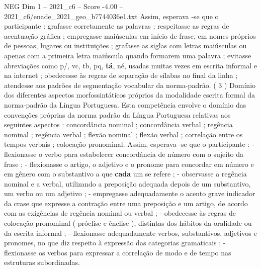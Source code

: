 \begin{textsample}{NEG Dim 1 – 2021\_c6 – Score -4.00 – 2021\_c6/enade\_2021\_geo\_b7744036e1.txt}
Assim, esperava -se que o participante : grafasse corretamente as palavras ; respeitasse as regras de acentuação gráfica ; empregasse maiúsculas em início de frase, em nomes próprios de pessoas, lugares ou instituições ; grafasse as siglas com letras maiúsculas ou apenas com a primeira letra maiúscula quando formarem uma palavra ; evitasse abreviações como p/, vc, tb, pq, \textbf{tá}, né, usadas muitas vezes em escrita informal e na internet ; obedecesse às regras de separação de sílabas no final da linha ; atendesse aos padrões de segmentação vocabular da norma-padrão. ( 3 ) Domínio dos diferentes aspectos morfossintáticos próprios da modalidade escrita formal da norma-padrão da Língua Portuguesa.
Esta competência envolve o domínio das convenções próprias da norma padrão da Língua Portuguesa relativas aos seguintes aspectos : concordância nominal ; concordância verbal ; regência nominal ; regência verbal ; flexão nominal ; flexão verbal ; correlação entre os tempos verbais ; colocação pronominal.
Assim, esperava -se que o participante : - flexionasse o verbo para estabelecer concordância de número com o sujeito da frase ; - flexionasse o artigo, o adjetivo e o pronome para concordar em número e em gênero com o substantivo a que \textbf{cada} um se refere ; - observasse a regência nominal e a verbal, utilizando a preposição adequada depois de um substantivo, um verbo ou um adjetivo ; - empregasse adequadamente o acento grave indicador da crase que expresse a contração entre uma preposição e um artigo, de acordo com as exigências de regência nominal ou verbal ; - obedecesse às regras de colocação pronominal ( próclise e ênclise ), distintas dos hábitos da oralidade ou da escrita informal ; - flexionasse adequadamente verbos, substantivos, adjetivos e pronomes, no que diz respeito à expressão das categorias gramaticais ; - flexionasse os verbos para expressar a correlação de modo e de tempo nas estruturas subordinadas.

\end{textsample}

